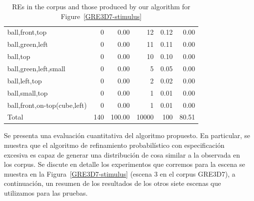 \begin{table}[!t]
\begin{small}
\begin{center}
\begin{tabular}{|l|r|r|r|r|r|}
ball,front,top                                &  0 &  0.00 &   12 &  0.12 &  0.00\\
ball,green,left	                              &  0 &  0.00 &   11 &  0.11 &  0.00\\
ball,top                                      &  0 &  0.00 &   10 &  0.10 &  0.00\\
ball,green,left,small                         &  0 &  0.00 &    5 &  0.05 &  0.00\\
ball,left,top                                 &  0 &  0.00 &    2 &  0.02 &  0.00\\
ball,small,top                                &  0 &  0.00 &    1 &  0.01 &  0.00\\
ball,front,on-top(cube,left)                  &  0 &  0.00 &    1 &  0.01 &  0.00\\
\hline
Total & 140 & 100.00 & 10000 & 100 & 80.51 \\
\hline
\end{tabular}
\caption{REs in the corpus and those produced by our algorithm for Figure~\ref{GRE3D7-stimulus}\label{results-algo-fig3}}
\vspace*{-.5cm}
\end{center}
\end{small}
\end{table}


Se presenta una evaluaci\'on cuantitativa del algoritmo propuesto.
En particular, se muestra que el algoritmo de refinamiento probabil\'{i}stico con especificaci\'on excesiva es capaz de generar una distribuci\'on de cosa similar a la observada en los corpus.
Se discute en detalle los experimentos que corremos para la escena se muestra en la Figura~\ref{GRE3D7-stimulus}  (escena 3 en el corpus GRE3D7), a continuaci\'on, un resumen de los resultados de los otros siete escenas que utilizamos para las pruebas.



